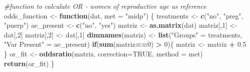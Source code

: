 \documentclass[
]{article}
\newenvironment{Shaded}{\begin{snugshade}}{\end{snugshade}}
\newcommand{\CommentTok}[1]{\textcolor[rgb]{0.56,0.35,0.01}{\textit{#1}}}
\newcommand{\ControlFlowTok}[1]{\textcolor[rgb]{0.13,0.29,0.53}{\textbf{#1}}}
\newcommand{\DataTypeTok}[1]{\textcolor[rgb]{0.13,0.29,0.53}{#1}}
\newcommand{\DecValTok}[1]{\textcolor[rgb]{0.00,0.00,0.81}{#1}}
\newcommand{\FloatTok}[1]{\textcolor[rgb]{0.00,0.00,0.81}{#1}}
\newcommand{\KeywordTok}[1]{\textcolor[rgb]{0.13,0.29,0.53}{\textbf{#1}}}
\newcommand{\NormalTok}[1]{#1}
\newcommand{\OperatorTok}[1]{\textcolor[rgb]{0.81,0.36,0.00}{\textbf{#1}}}
\newcommand{\OtherTok}[1]{\textcolor[rgb]{0.56,0.35,0.01}{#1}}
\newcommand{\StringTok}[1]{\textcolor[rgb]{0.31,0.60,0.02}{#1}}
\begin{document}
\begin{Shaded}
\begin{Highlighting}[]
\CommentTok{#function to calculate OR - women of reproductive age as reference}
\NormalTok{odds_function <-}\StringTok{ }\ControlFlowTok{function}\NormalTok{(dat, }\DataTypeTok{met =} \StringTok{"midp"}\NormalTok{) \{}
\NormalTok{  treatments <-}\StringTok{ }\KeywordTok{c}\NormalTok{(}\StringTok{"no"}\NormalTok{, }\StringTok{"preg"}\NormalTok{, }\StringTok{"puerp"}\NormalTok{)}
\NormalTok{  ae_present <-}\StringTok{ }\KeywordTok{c}\NormalTok{(}\StringTok{"no"}\NormalTok{, }\StringTok{"yes"}\NormalTok{)}
\NormalTok{  matriz <-}\StringTok{ }\KeywordTok{as.matrix}\NormalTok{(dat)}
\NormalTok{  matriz[,}\DecValTok{1}\NormalTok{] <-}\StringTok{ }\NormalTok{dat[,}\DecValTok{2}\NormalTok{]}
\NormalTok{  matriz[,}\DecValTok{2}\NormalTok{] <-}\StringTok{ }\NormalTok{dat[,}\DecValTok{1}\NormalTok{]}
  \KeywordTok{dimnames}\NormalTok{(matriz) <-}\StringTok{ }\KeywordTok{list}\NormalTok{(}\StringTok{"Groups"}\NormalTok{ =}\StringTok{ }\NormalTok{treatments, }
                           \StringTok{"Var Present"}\NormalTok{ =}\StringTok{ }\NormalTok{ae_present)}
  \ControlFlowTok{if}\NormalTok{(}\KeywordTok{sum}\NormalTok{(matriz}\OperatorTok{==}\DecValTok{0}\NormalTok{) }\OperatorTok{>}\StringTok{ }\DecValTok{0}\NormalTok{)\{}
\NormalTok{    matriz <-}\StringTok{ }\NormalTok{matriz }\OperatorTok{+}\StringTok{ }\FloatTok{0.5}
\NormalTok{  \}}
\NormalTok{  or_fit <-}\StringTok{ }\KeywordTok{oddsratio}\NormalTok{(matriz, }\DataTypeTok{correction=}\OtherTok{TRUE}\NormalTok{, }\DataTypeTok{method =}\NormalTok{ met)}
  \KeywordTok{return}\NormalTok{(or_fit)}
\NormalTok{\}}


\end{Highlighting}
\end{Shaded}
\end{document}

